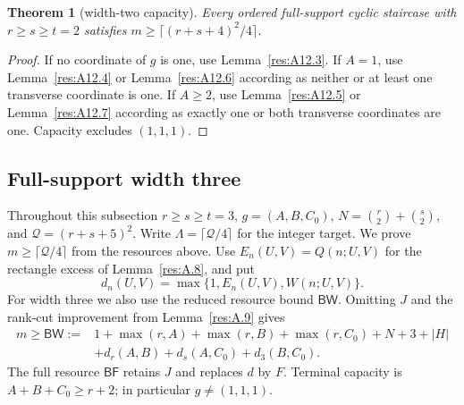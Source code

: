 \documentclass[11pt]{article}
\newtheorem{theorem}{Theorem}[section]
\theoremstyle{definition}
\theoremstyle{remark}
\theoremstyle{plain}
\begin{document}
\begin{theorem}[width-two capacity]\label{res:A12.8}
Every ordered full-support cyclic staircase with $r\ge s\ge t=2$
satisfies $m\ge\lceil(r+s+4)^2/4\rceil$.
\end{theorem}
\begin{proof}
If no coordinate of $g$ is one, use Lemma~\ref{res:A12.3}.  If $A=1$, use Lemma~\ref{res:A12.4} or
Lemma~\ref{res:A12.6} according as neither or at least one transverse coordinate is
one.  If $A\ge2$, use Lemma~\ref{res:A12.5} or Lemma~\ref{res:A12.7} according as exactly one or both
transverse coordinates are one.  Capacity excludes $(1,1,1)$.
\end{proof}

\subsection{Full-support width three}

Throughout this subsection $r\ge s\ge t=3$, $g=(A,B,C_0)$,
$N=\binom r2+\binom s2$, and $\mathcal Q=(r+s+5)^2$. Write $\Lambda=\lceil\mathcal Q/4\rceil$ for the integer target.
We prove $m\ge\lceil\mathcal Q/4\rceil$ from the resources above.
Use $E_n(U,V)=Q(n;U,V)$ for the rectangle excess of Lemma~\ref{res:A.8}, and put
\[
 d_n(U,V)=\max\{1,E_n(U,V),W(n;U,V)\}.
\]
For width three we also use the reduced resource bound $\mathsf{BW}$.
Omitting $J$ and the rank-cut improvement from Lemma~\ref{res:A.9} gives
\[
\begin{split}
 m\ge\mathsf{BW}:={}&1+\max(r,A)+\max(r,B)+\max(r,C_0)+N+3+|H|\\
 &+d_r(A,B)+d_s(A,C_0)+d_3(B,C_0).
\end{split}\tag{3.14}\label{eq:capacity-14}
\]
The full resource $\mathsf{BF}$ retains $J$ and replaces $d$ by $F$.
Terminal capacity is $A+B+C_0\ge r+2$; in particular $g\ne(1,1,1)$.
\end{document}
